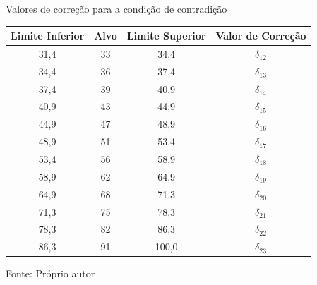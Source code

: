\begin{frame}{Valores de correção para a condição de contradição}

\begin{table}[h]
\centering
\label{tab:correcaoDelta}

\begin{tabular}{c|c|c||c}
\hline
Limite Inferior & Alvo & Limite Superior & Valor de Correção\\ \hline
\hline
31,4 & 33 & 34,4 & $\delta_{12}$ \\ \hline
34,4 & 36 & 37,4 & $\delta_{13}$ \\ \hline
37,4 & 39 & 40,9 & $\delta_{14}$ \\ \hline
40,9 & 43 & 44,9 & $\delta_{15}$ \\ \hline
44,9 & 47 & 48,9 & $\delta_{16}$ \\ \hline
48,9 & 51 & 53,4 & $\delta_{17}$ \\ \hline
53,4 & 56 & 58,9 & $\delta_{18}$ \\ \hline
58,9 & 62 & 64,9 & $\delta_{19}$ \\ \hline
64,9 & 68 & 71,3 & $\delta_{20}$ \\ \hline
71,3 & 75 & 78,3 & $\delta_{21}$ \\ \hline
78,3 & 82 & 86,3 & $\delta_{22}$ \\ \hline
86,3 & 91 &100,0 & $\delta_{23}$ \\ \hline

\end{tabular}
{\vspace{-0.2cm} \small Fonte: Próprio autor}
\end{table}

\end{frame}
